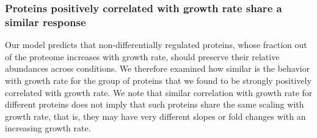 \subsubsection{Proteins positively correlated with growth rate share a similar response}
\label{propchange} 
Our model predicts that non-differentially regulated proteins, whose fraction out of the proteome increases with growth rate, should preserve their relative abundances across conditions.
We therefore examined how similar is the behavior with growth rate for the group of proteins that we found  to be strongly positively correlated with growth rate.
We note that similar correlation with growth rate for different proteins does not imply that such proteins share the same scaling with growth rate, that is, they may have very different slopes or fold changes with an increasing growth rate.